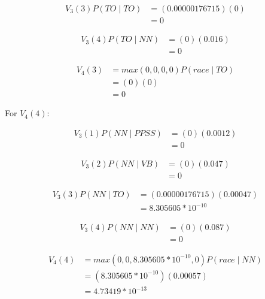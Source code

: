 \documentclass[10pt,a4paper]{article}
\begin{document}
\begin{equation}
\begin{split}
V_3(3)P(TO\mid TO) &= (0.00000176715)(0) \\
&= 0
\end{split}
\end{equation}

\begin{equation}
\begin{split}
V_3(4)P(TO\mid NN) &= (0)(0.016) \\
 &= 0
\end{split}
\end{equation}

\begin{equation}
\begin{split}
V_4(3) &= max(0,0,0,0)P(race\mid TO) \\
 &=(0)(0) \\
 &=0
\end{split}
\end{equation}

For $V_4(4):$

\begin{equation}
\begin{split}
V_3(1)P(NN\mid PPSS) &= (0)(0.0012) \\
&= 0
\end{split}
\end{equation}

\begin{equation}
\begin{split}
V_3(2)P(NN\mid VB) &= (0)(0.047) \\
 &= 0
\end{split}
\end{equation}

\begin{equation}
\begin{split}
V_3(3)P(NN\mid TO) &= (0.00000176715)(0.00047) \\
&= 8.305605*10^{-10}
\end{split}
\end{equation}

\begin{equation}
\begin{split}
V_3(4)P(NN\mid NN) &= (0)(0.087) \\
 &= 0
\end{split}
\end{equation}

\begin{equation}
\begin{split}
V_4(4) &= max(0,0,8.305605*10^{-10},0)P(race\mid NN) \\
 &=(8.305605*10^{-10})(0.00057) \\
 &=4.73419*10^{-13}
\end{split}
\end{equation}
\end{document}
